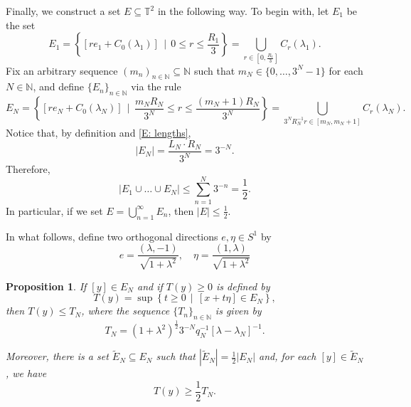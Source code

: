 \documentclass[12pt]{amsart}
\newtheorem{prop}{Proposition}
\begin{document}
Finally, we construct a set $E \subseteq \mathbb{T}^{2}$ in the following way. To begin with, let $E_{1}$ be the set
	\begin{equation*}
		E_{1} = \left\{[r e_{1} + C_{0}(\lambda_{1})] \, \mid \, 0 \leq r \leq \frac{R_{1}}{3} \right\} = \bigcup_{r \in [0,\frac{R_{1}}{3}]} C_{r}(\lambda_{1}).
	\end{equation*}
Fix an arbitrary sequence $(m_{n})_{n \in \mathbb{N}} \subseteq \mathbb{N}$ such that $m_{N} \in \{0,\dots,3^{N} - 1\}$ for each $N \in \mathbb{N}$, and define $\{E_{n}\}_{n \in \mathbb{N}}$ via the rule
	\begin{equation*}
		E_{N} = \left\{[r e_{N} + C_{0}(\lambda_{N})] \, \mid \, \frac{m_{N} R_{N}}{3^{N}} \leq r \leq \frac{(m_{N} + 1) R_{N}}{3^{N}} \right\} = \bigcup_{3^{N} R_{N}^{-1} r \in [m_{N}, m_{N} + 1]} C_{r}(\lambda_{N}).
	\end{equation*}
Notice that, by definition and \eqref{E: lengths}, 	
	\begin{equation*}
		|E_{N}| = \frac{L_{N} \cdot R_{N}}{3^{N}} = 3^{-N}.
	\end{equation*}
Therefore,
	\begin{equation*}
		|E_{1} \cup \dots \cup E_{N}| \leq \sum_{n = 1}^{N} 3^{-n} = \frac{1}{2}.		\end{equation*}
In particular, if we set $E = \bigcup_{n = 1}^{\infty} E_{n}$, then $|E| \leq \frac{1}{2}$. 

In what follows, define two orthogonal directions $e, \eta \in S^{1}$ by 
	\begin{equation*}
		e = \frac{(\lambda, -1)}{\sqrt{1 + \lambda^{2}}}, \quad \eta = \frac{(1,\lambda)}{\sqrt{1 + \lambda^{2}}}
	\end{equation*}

	\begin{prop} \label{P: time}If $[y] \in E_{N}$ and if $T(y) \geq 0$ is defined by
		\begin{equation*}
			T(y) = \sup \left\{ t \geq 0 \, \mid \, [x + t \eta] \in E_{N} \right\},
		\end{equation*}
	then $T(y) \leq T_{N}$, where the sequence $\{T_{n}\}_{n \in \mathbb{N}}$ is given by
		\begin{equation*}
			T_{N} = (1 + \lambda^{2})^{\frac{1}{2}} 3^{-N} q_{N}^{-1} [\lambda - \lambda_{N}]^{-1}.
		\end{equation*}
	
	Moreover, there is a set $\tilde{E}_{N} \subseteq E_{N}$ such that $|\tilde{E}_{N}| = \frac{1}{2} |E_{N}|$ and, for each $[y] \in \tilde{E}_{N}$, we have
		\begin{equation*}
			T(y) \geq \frac{1}{2} T_{N}.
		\end{equation*}
	\end{prop} 
\end{document}
